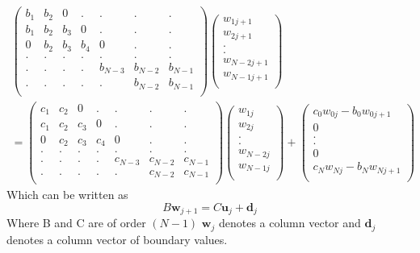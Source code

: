 \begin{eqnarray*}
\left(\begin{array}{ccccccc}
b_1&b_2&0&.&.&.&.\\
b_1&b_2&b_3&0&.&.&.\\
0&b_2&b_3&b_4&0&.&.\\
.&.&.&.&.&.&.\\
.&.&.&.&b_{N-3}&b_{N-2}&b_{N-1}\\
.&.&.&.&.&b_{N-2}&b_{N-1}\\
\end{array}\right)
\left(\begin{array}{c}
w_{1j+1}\\
w_{2j+1}\\
.\\
.\\
w_{N-2j+1}\\
w_{N-1j+1}\\
\end{array}\right)
\\
=
\left(\begin{array}{ccccccc}
c_1&c_2&0&.&.&.&.\\
c_1&c_2&c_3&0&.&.&.\\
0&c_2&c_3&c_4&0&.&.\\
.&.&.&.&.&.&.\\
.&.&.&.&c_{N-3}&c_{N-2}&c_{N-1}\\
.&.&.&.&.&c_{N-2}&c_{N-1}\\
\end{array}\right)
\left(\begin{array}{c}
w_{1j}\\
w_{2j}\\
.\\
.\\
w_{N-2j}\\
w_{N-1j}\\
\end{array}\right)
+
\left(\begin{array}{c}
c_0w_{0j}-b_0w_{0j+1}\\
0\\
.\\
.\\
0\\
c_Nw_{Nj}-b_{N}w_{Nj+1}\\
\end{array}\right)
\end{eqnarray*}
Which can be written as
\[ B\mathbf{w}_{j+1}=C\mathbf{u}_j+\mathbf{d}_j \]
Where B and C are of order $(N-1)$ $\mathbf{w}_j$ denotes a column vector and
$\mathbf{d}_j$ denotes a column vector of boundary values.\\
